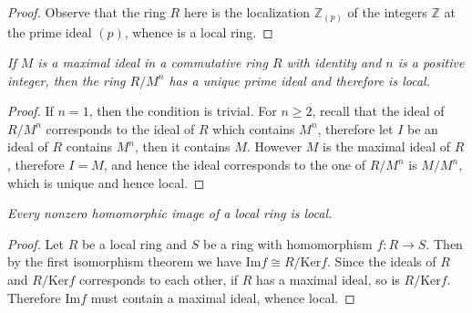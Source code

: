 \begin{proof}
Observe that the ring $R$ here is the localization $\mathbb{Z}_{(p)}$ of the integers $\mathbb{Z}$ at the prime ideal $(p)$, whence is a local ring.
\end{proof}
\begin{problem}\em
If $M$ is a maximal ideal in a commutative ring $R$ with identity and $n$ is a positive integer, then the ring $R/M^n$ has a unique prime ideal and therefore is local.
\end{problem}
\begin{proof}
If $n=1$, then the condition is trivial. For $n\ge 2$, recall that the ideal of $R/M^n$ corresponds to the ideal of $R$ which contains $M^n$, therefore let $I$ be an ideal of $R$ contains $M^n$, then it contains $M$. However $M$ is the maximal ideal of $R$, therefore $I=M$, and hence the ideal corresponds to the one of $R/M^n$ is $M/M^n$, which is unique and hence local.
\end{proof}
\begin{problem}\em
Every nonzero homomorphic image of a local ring is local.
\end{problem}
\begin{proof}
Let $R$ be a local ring and $S$ be a ring with homomorphism $f:R\to S$. Then by the first isomorphism theorem we have $\mathrm{Im}f\cong R/\mathrm{Ker}f$. Since the ideals of $R$ and $R/\mathrm{Ker}f$ corresponds to each other, if $R$ has a maximal ideal, so is $R/\mathrm{Ker}f$. Therefore $\mathrm{Im}f$ must contain a maximal ideal, whence local.
\end{proof}
